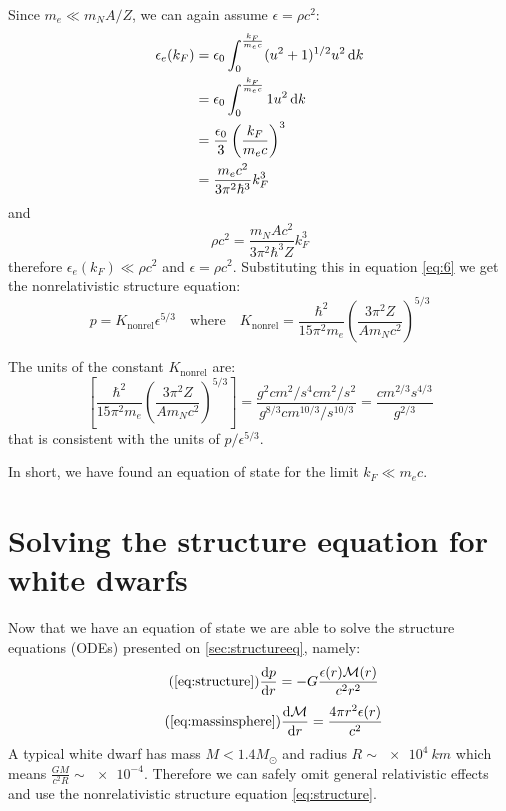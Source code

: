 \documentclass[a4paper]{article}
\newcommand\M{\mathcal{M}}
\newcommand\Msun{M_{\odot}}
\begin{document}
Since $m_e \ll m_N A/Z$, we can again assume $\epsilon = \rho c^2$:
\begin{equation}
\begin{split}
    \epsilon_e(k_F) &= \epsilon_0 \int^{\frac{k_F}{m_ec}}_{0} (u^2+1)^{1/2} u^2 \odif{k}\\
    & = \epsilon_0 \int^{\frac{k_F}{m_ec}}_{0} 1u^2 \odif{k}\\
    & = \frac{\epsilon_0}{3}\left(\frac{k_F}{m_ec}\right)^3\\    & = \frac{m_e c^2}{3\pi^2\hbar^3}k_F^3
\end{split}
\end{equation}
and
\begin{equation*}
    \rho c^2 =\frac{m_N A c^2}{3\pi^2\hbar^3Z}k_F^3 
\end{equation*}
therefore $\epsilon_e(k_F) \ll  \rho c^2$ and $\epsilon=\rho c^2$. Substituting this in equation \eqref{eq:6} we get the nonrelativistic structure equation:
\begin{equation} \label{eq:30}
    p =  K_{\mathrm{nonrel}} \epsilon^{5/3} \quad \mathrm{where} \quad K_{\mathrm{nonrel}}=\frac{\hbar^2 }{15 \pi ^2 m_e}\left(\frac{3\pi^2Z}{Am_Nc^2}\right)^{5/3}
\end{equation}

The units of the constant $K_{\mathrm{nonrel}}$ are:
\begin{equation}
    \left[\frac{\hbar^2 }{15 \pi ^2 m_e}\left(\frac{3\pi^2Z}{Am_Nc^2}\right)^{5/3}\right] = \frac{\unit{g^2cm^2/s^4}\unit{cm^2/s^2}}{\unit{g^{8/3}cm^{10/3}/s^{10/3}}} = \frac{\unit{cm^{2/3}s^{4/3}}}{\unit{g^{2/3}}}
\end{equation}
that is consistent with the units of $p/\epsilon^{5/3}$.

In short, we have found an equation of state for the limit $k_F \ll m_ec$.

\section{Solving the structure equation for white dwarfs} \label{sec:solvingstructure}

Now that we have an equation of state we are able to solve the structure equations (ODEs) presented on \autoref{sec:structureeq}, namely:
\begin{equation} \tag{\ref{eq:structure}}
    \odv{p}{r} = -G\frac{\epsilon(r)\M(r)}{c^2r^2}
\end{equation}
\begin{equation} \tag{\ref{eq:massinsphere}}
    \odv{\M}{r} = \frac{4\pi r^2\epsilon(r)}{c^2}
\end{equation}
A typical white dwarf has mass $M<1.4 \Msun$ and radius $R\sim \qty{e4}{km}$ which means $\frac{GM}{c^2R} \sim \num{e-4}$. Therefore we can safely omit general relativistic effects and use the nonrelativistic structure equation \eqref{eq:structure}.
\end{document}
